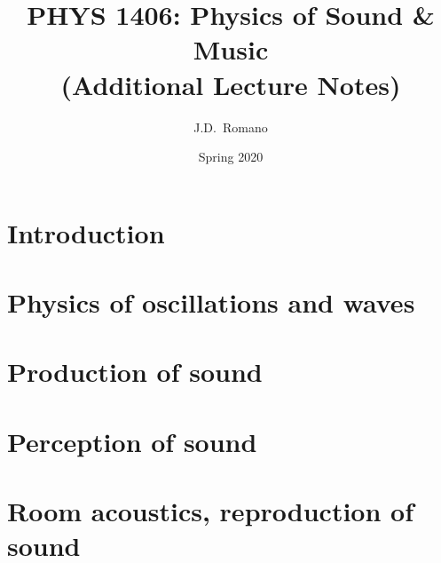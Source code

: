 \documentclass[10pt,twoside]{article}
\numberwithin{equation}{section}
\begin{document}
\title{PHYS 1406: Physics of Sound \& Music\\
(Additional Lecture Notes)}
\author{J.D.\ Romano}
\date{Spring 2020}
\maketitle
 
\begin{abstract}

\end{abstract}

\cleardoublepage
\tableofcontents

\cleardoublepage
\part{Introduction}

\cleardoublepage


\cleardoublepage
\part{Physics of oscillations and waves}

\cleardoublepage


\cleardoublepage


\cleardoublepage


\cleardoublepage
\part{Production of sound}

\cleardoublepage


\cleardoublepage


\cleardoublepage


\cleardoublepage


\cleardoublepage


\cleardoublepage
\part{Perception of sound}

\cleardoublepage


\cleardoublepage


\cleardoublepage


\cleardoublepage
\part{Room acoustics, reproduction of sound}
\end{document}
